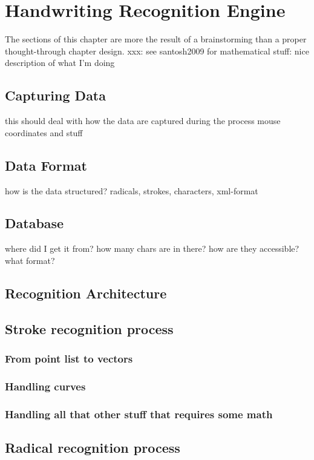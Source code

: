 
\chapter{Handwriting Recognition Engine}
The sections of this chapter are more the result of a brainstorming 
than a  proper thought-through chapter design.
xxx: see santosh2009 for mathematical stuff: nice description of what I'm doing

\section{Capturing Data}
this should deal with how the data are captured during the process
mouse coordinates and stuff

\section{Data Format}
how is the data structured? radicals, strokes, characters, xml-format

\section{Database}
where did I get it from? how many chars are in there?
how are they accessible? what format?

\section{Recognition Architecture}

\section{Stroke recognition process}
\subsection{From point list to vectors}
\subsection{Handling curves}
\subsection{Handling all that other stuff that requires some math}

\section{Radical recognition process}
